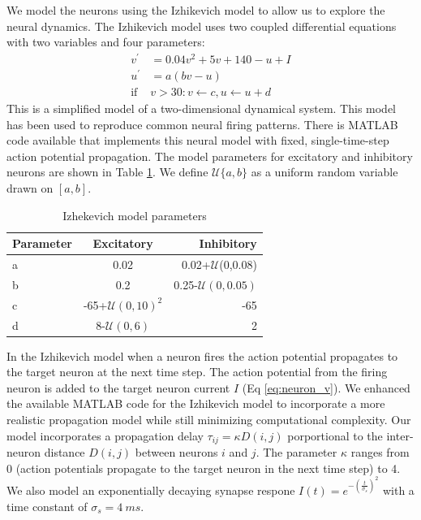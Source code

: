 \documentclass[a4paper,11pt]{article}
\begin{document}
We model the neurons using the Izhikevich model \cite{izhikevich2003} to allow us to explore the neural dynamics.
The Izhikevich model uses two coupled differential equations with two variables and four parameters:
\begin{align}
 v^\prime &= 0.04v^2+5v+140-u+I \label{eq:neuron_v} \\
 u^\prime &= a(bv-u)\\
 \text{if } &v>30: v\leftarrow c, u\leftarrow u+d
\end{align}
This is a simplified model of a two-dimensional dynamical system.
This model has been used to reproduce common neural firing patterns.
There is MATLAB code available \cite{izzy_code} that implements this neural model with fixed, single-time-step action potential propagation.
The model parameters for excitatory and inhibitory neurons are shown in Table \ref{tab:izzy_params}.
We define $\mathcal{U}\{a,b \}$ as a uniform random variable drawn on $[ a,b ] $.
\begin{table}[!h]
 \caption{Izhekevich model parameters}
 \label{tab:izzy_params}
 \centering
 \begin{tabular}{l|c|r}
  \textbf{Parameter} & \textbf{Excitatory} & \textbf{Inhibitory} \\
  \hline
  a & 0.02 & 0.02+$\mathcal{U}$(0,0.08) \\
  b & 0.2 & 0.25-$\mathcal{U}(0,0.05)$\\
  c & -65+$\mathcal{U}(0,10)^2$ & -65 \\
  d & 8-$\mathcal{U}(0,6)$& 2 \\
 \end{tabular}
\end{table}

In the Izhikevich model when a neuron fires the action potential propagates to the target neuron at the next time step.
The action potential from the firing neuron is added to the target neuron current $I$ (Eq \ref{eq:neuron_v}).
We enhanced the available MATLAB code for the Izhikevich model to incorporate a more realistic propagation model while still minimizing computational complexity.
Our model incorporates a propagation delay $\tau_{ij}=\kappa D(i,j)$ porportional to the inter-neuron distance $D(i,j)$ between neurons $i$ and $j$. 
The parameter $\kappa$ ranges from 0 (action potentials propagate to the target neuron in the next time step) to 4. 
We also model an exponentially decaying synapse respone $I(t)=e^{-(\frac{t}{\sigma_s})^2}$ with a time constant of $\sigma_s=4~ms$.
\end{document}
